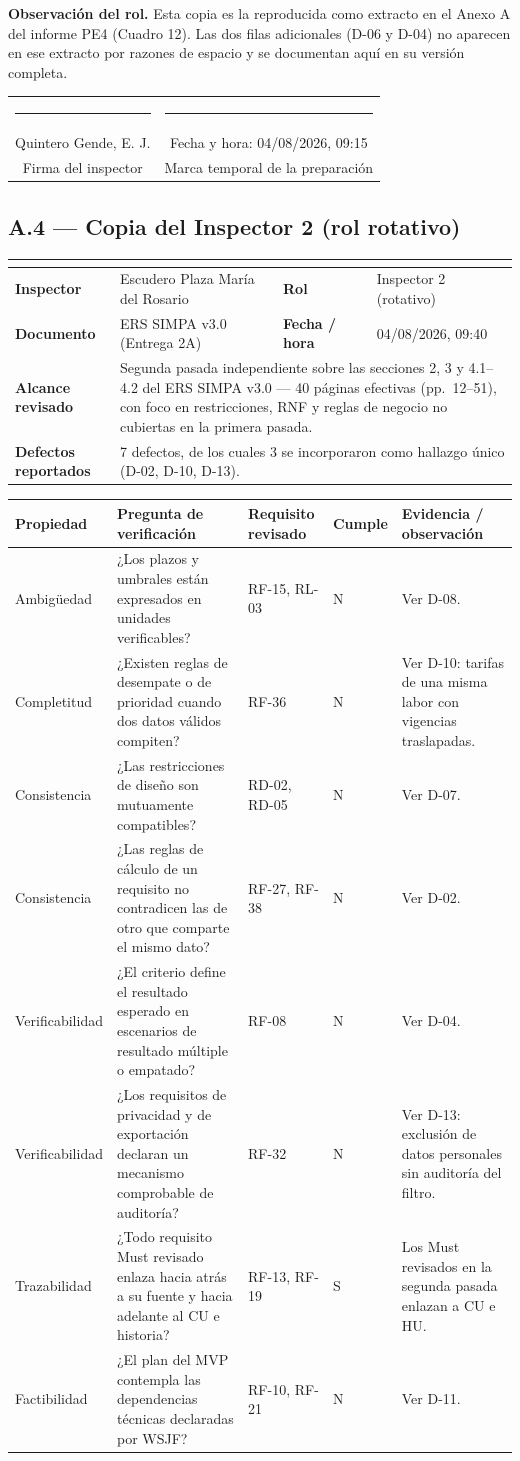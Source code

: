 \documentclass[11pt,letterpaper]{article}
\makeatletter
\newcommand{\ficha}[5]{%
\begin{center}\small
\begin{tabularx}{\textwidth}{|>{\bfseries}p{3.2cm}|X|>{\bfseries}p{2.6cm}|p{4.2cm}|}
\hline
\rowcolor{gris}\multicolumn{4}{|l|}{\bfseries Lista de verificación de inspección --- Anexo A (ISO/IEC/IEEE 29148:2018, §6.4)}\\
\hline
Inspector & #1 & Rol & #2 \\
\hline
Documento & ERS SIMPA v3.0 (Entrega 2A) & Fecha / hora & #3 \\
\hline
Alcance revisado & \multicolumn{3}{p{12.6cm}|}{#4} \\
\hline
Defectos reportados & \multicolumn{3}{p{12.6cm}|}{#5} \\
\hline
\end{tabularx}
\end{center}}
\newcommand{\cabecera}{%
\rowcolor{gris}\textbf{Propiedad} & \textbf{Pregunta de verificación} & \textbf{Requisito revisado} & \textbf{Cumple} & \textbf{Evidencia / observación}\\}
\newcommand{\firma}[2]{%
\vspace{0.5cm}
\begin{center}
\begin{tabular}{c@{\hspace{2.5cm}}c}
\rule{6cm}{0.4pt} & \rule{5cm}{0.4pt}\\
{\small #1} & {\small Fecha y hora: #2}\\
{\small Firma del inspector} & {\small Marca temporal de la preparación}\\
\end{tabular}
\end{center}}
\makeatother
\begin{document}
\small \textbf{Observación del rol.} Esta copia es la reproducida como extracto en el Anexo A
del informe PE4 (Cuadro 12). Las dos filas adicionales (D-06 y D-04) no aparecen en ese
extracto por razones de espacio y se documentan aquí en su versión completa.
\normalsize

\firma{Quintero Gende, E. J.}{04/08/2026, 09:15}

\clearpage

\subsection*{A.4 --- Copia del Inspector 2 (rol rotativo)}
\ficha{Escudero Plaza María del Rosario}{Inspector 2 (rotativo)}{04/08/2026, 09:40}
{Segunda pasada independiente sobre las secciones 2, 3 y 4.1--4.2 del ERS SIMPA v3.0 --- 40 páginas efectivas (pp.\ 12--51), con foco en restricciones, RNF y reglas de negocio no cubiertas en la primera pasada.}
{7 defectos, de los cuales 3 se incorporaron como hallazgo único (D-02, D-10, D-13).}

\begin{center}\footnotesize
\begin{tabularx}{\textwidth}{P{2.0cm} X P{2.5cm} C{1.2cm} P{3.2cm}}
\toprule
\cabecera
\midrule
Ambigüedad & ¿Los plazos y umbrales están expresados en unidades verificables? & RF-15, RL-03 & N & Ver D-08.\\
Completitud & ¿Existen reglas de desempate o de prioridad cuando dos datos válidos compiten? & RF-36 & N & Ver D-10: tarifas de una misma labor con vigencias traslapadas.\\
Consistencia & ¿Las restricciones de diseño son mutuamente compatibles? & RD-02, RD-05 & N & Ver D-07.\\
Consistencia & ¿Las reglas de cálculo de un requisito no contradicen las de otro que comparte el mismo dato? & RF-27, RF-38 & N & Ver D-02.\\
Verificabilidad & ¿El criterio define el resultado esperado en escenarios de resultado múltiple o empatado? & RF-08 & N & Ver D-04.\\
Verificabilidad & ¿Los requisitos de privacidad y de exportación declaran un mecanismo comprobable de auditoría? & RF-32 & N & Ver D-13: exclusión de datos personales sin auditoría del filtro.\\
Trazabilidad & ¿Todo requisito Must revisado enlaza hacia atrás a su fuente y hacia adelante al CU e historia? & RF-13, RF-19 & S & Los Must revisados en la segunda pasada enlazan a CU e HU.\\
Factibilidad & ¿El plan del MVP contempla las dependencias técnicas declaradas por WSJF? & RF-10, RF-21 & N & Ver D-11.\\
\bottomrule
\end{tabularx}
\end{center}
\end{document}
